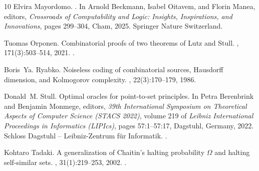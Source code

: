 \documentclass[a4paper,oneside,reqno,12pt]{amsart}
\theoremstyle{plain}
\theoremstyle{definition}
\theoremstyle{remark}
\begin{document}
\begin{thebibliography}{10}
Elvira Mayordomo.
.
\newblock In Arnold Beckmann, Isabel Oitavem, and Florin Manea, editors, {\em Crossroads of Computability and Logic: Insights, Inspirations, and Innovations}, pages 299--304, Cham, 2025. Springer Nature Switzerland.

Tuomas Orponen.
\newblock Combinatorial proofs of two theorems of {Lutz} and {Stull}.
, 171(3):503--514, 2021.
\newblock \href {https://doi.org/10.1017/S0305004120000328} {}.

Boris~Ya. Ryabko.
\newblock Noiseless coding of combinatorial sources, {Hausdorff} dimension, and {Kolmogorov} complexity.
, 22(3):170--179, 1986.

Donald~M. Stull.
\newblock Optimal oracles for point-to-set principles.
\newblock In Petra Berenbrink and Benjamin Monmege, editors, {\em 39th International Symposium on Theoretical Aspects of Computer Science (STACS 2022)}, volume 219 of {\em Leibniz International Proceedings in Informatics (LIPIcs)}, pages 57:1--57:17, Dagstuhl, Germany, 2022. Schloss Dagstuhl -- Leibniz-Zentrum f{\"u}r Informatik.
\newblock \href {https://doi.org/10.4230/LIPIcs.STACS.2022.57} {}.

Kohtaro Tadaki.
\newblock A generalization of {C}haitin's halting probability {$\Omega$} and halting self-similar sets.
, 31(1):219--253, 2002.
\newblock \href {https://doi.org/10.14492/hokmj/1350911778} {}.

\end{thebibliography}

%
%
\end{document}
